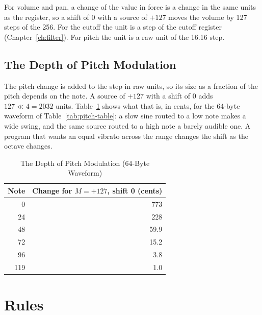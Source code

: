 For volume and pan, a change of the value in force is a change in the same units as the register, so a shift of 0 with
a source of $+127$ moves the volume by 127 steps of the 256. For the cutoff the unit is a step of the cutoff register
(Chapter~\ref{ch:filter}). For pitch the unit is a raw unit of the 16.16 step.

\subsection{The Depth of Pitch Modulation}
\label{sec:mod-pitch-depth}

The pitch change is added to the step in raw units, so its size as a fraction of the pitch depends on the note. A
source of $+127$ with a shift of 0 adds $127 \ll 4 = 2032$ units. Table~\ref{tab:mod-pitch-depth} shows what that is,
in cents, for the 64-byte waveform of Table~\ref{tab:pitch-table}: a slow sine routed to a low note makes a wide swing,
and the same source routed to a high note a barely audible one. A program that wants an equal vibrato across the range
changes the shift as the octave changes.

\begin{table}[H]
	\centering
	\begin{tabular}{rr}
		\toprule
		\textbf{Note} & \textbf{Change for $M = +127$, shift 0 (cents)} \\
		\midrule
		0             & 773                                             \\
		24            & 228                                             \\
		48            & 59.9                                            \\
		72            & 15.2                                            \\
		96            & 3.8                                             \\
		119           & 1.0                                             \\
		\bottomrule
	\end{tabular}
	\caption{The Depth of Pitch Modulation (64-Byte Waveform)}
	\label{tab:mod-pitch-depth}
\end{table}

\section{Rules}

